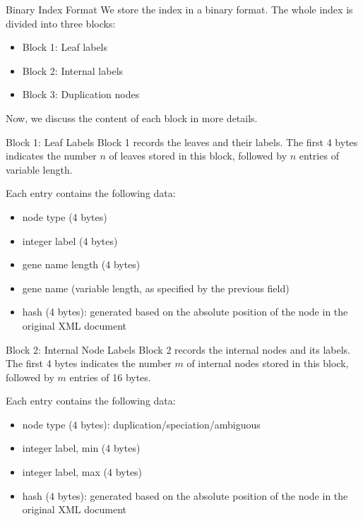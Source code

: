 \documentclass{beamer}
\begin{document}
\begin{frame}{Binary Index Format}
    We store the index in a binary format. The whole index is divided into three blocks:
    \begin{itemize}
        \item Block 1: Leaf labels
        \item Block 2: Internal labels
        \item Block 3: Duplication nodes
    \end{itemize}
    Now, we discuss the content of each block in more details.
\end{frame}

\begin{frame}{Block 1: Leaf Labels}
    Block 1 records the leaves and their labels. The first 4 bytes indicates the number $n$ of leaves stored in this block, followed by $n$ entries of variable length.

    Each entry contains the following data:
    \begin{itemize}
        \item node type (4 bytes)
        \item integer label (4 bytes)
        \item gene name length (4 bytes)
        \item gene name (variable length, as specified by the previous field)
        \item hash (4 bytes): generated based on the absolute position of the node in the original XML document
    \end{itemize}
\end{frame}

\begin{frame}{Block 2: Internal Node Labels}
    Block 2 records the internal nodes and its labels. The first 4 bytes indicates the number $m$ of internal nodes stored in this block, followed by $m$ entries of 16 bytes.

    Each entry contains the following data:
    \begin{itemize}
        \item node type (4 bytes): duplication/speciation/ambiguous
        \item integer label, min (4 bytes)
        \item integer label, max (4 bytes)
        \item hash (4 bytes): generated based on the absolute position of the node in the original XML document
    \end{itemize}
\end{frame}
\end{document}
